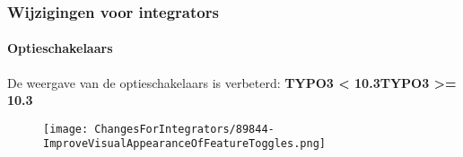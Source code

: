 
\begin{frame}[fragile]
	\frametitle{Wijzigingen voor integrators}
	\framesubtitle{Optieschakelaars}

	De weergave van de optieschakelaars is verbeterd:
	\newline\newline
	\smaller\textbf{TYPO3 < 10.3}\tabto{6cm}\textbf{TYPO3 >= 10.3}\normalsize

	\begin{figure}
		\texttt{[image: ChangesForIntegrators/89844-ImproveVisualAppearanceOfFeatureToggles.png]}
	\end{figure}

\end{frame}

%
%
%
%
%
%
%
